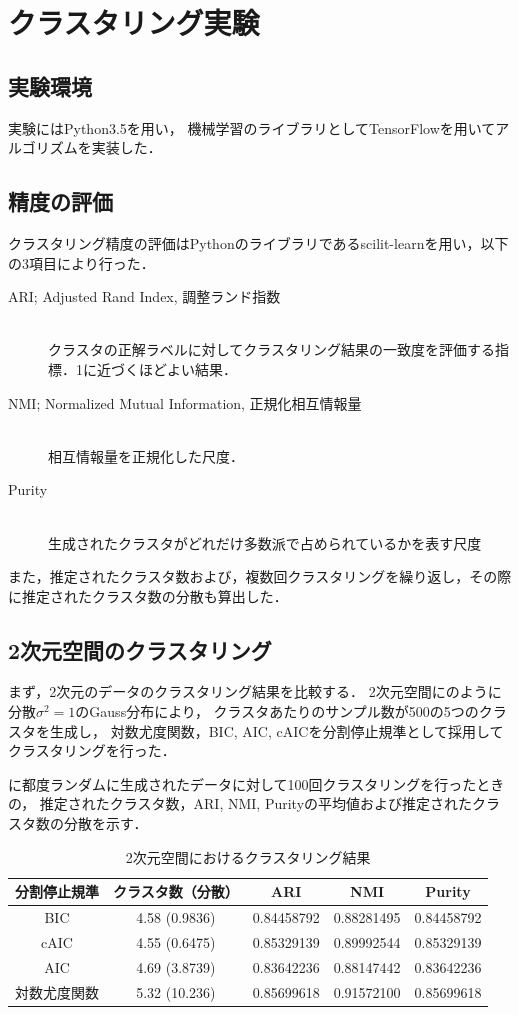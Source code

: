 \section{クラスタリング実験}

\subsection{実験環境}
実験にはPython3.5を用い，
機械学習のライブラリとしてTensorFlowを用いてアルゴリズムを実装した．

\subsection{精度の評価}
クラスタリング精度の評価はPythonのライブラリであるscilit-learnを用い，以下の3項目により行った．
\begin{description}
  \item[ARI; Adjusted Rand Index, 調整ランド指数]~\\
    クラスタの正解ラベルに対してクラスタリング結果の一致度を評価する指標．1に近づくほどよい結果．
  \item[NMI; Normalized Mutual Information, 正規化相互情報量]~\\
    相互情報量を正規化した尺度．
  \item[Purity]~\\
    生成されたクラスタがどれだけ多数派で占められているかを表す尺度
\end{description}

また，推定されたクラスタ数および，複数回クラスタリングを繰り返し，その際に推定されたクラスタ数の分散も算出した．

\subsection{2次元空間のクラスタリング}

まず，2次元のデータのクラスタリング結果を比較する．
2次元空間にのように分散$\sigma^2=1$のGauss分布により，
クラスタあたりのサンプル数が500の5つのクラスタを生成し，
対数尤度関数，BIC, AIC, cAICを分割停止規準として採用してクラスタリングを行った．

に都度ランダムに生成されたデータに対して100回クラスタリングを行ったときの，
推定されたクラスタ数，ARI, NMI, Purityの平均値および推定されたクラスタ数の分散を示す．

\begin{table}[htb]
  \centering
  \caption{2次元空間におけるクラスタリング結果}
  \label{table:2dim}
  \begin{tabular}{|c|c|c|c|c|} \hline
    分割停止規準 & クラスタ数（分散） & ARI & NMI & Purity \\\hline
    BIC & 4.58 (0.9836) & 0.84458792 & 0.88281495 & 0.84458792\\
    cAIC & 4.55 (0.6475) & 0.85329139 & 0.89992544 & 0.85329139\\
    AIC & 4.69 (3.8739) & 0.83642236 & 0.88147442 & 0.83642236\\
    対数尤度関数 & 5.32 (10.236) & 0.85699618 & 0.91572100 & 0.85699618\\\hline 
  \end{tabular}
\end{table}

